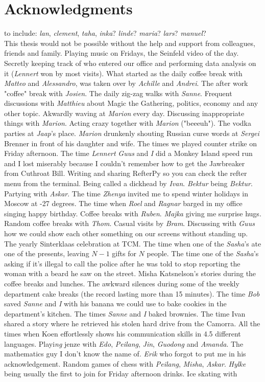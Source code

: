 \chapter*{Acknowledgments}
to include: \emph{lan}, \emph{clement}, \emph{taha}, \emph{inka}? \emph{linde}? \emph{maria}? \emph{lars}? \emph{manuel}?\\
This thesis would not be possible without the help and support from colleagues, friends and family. Playing music on Fridays, the Seinfeld video of the day. Secretly keeping track of who entered our office and performing data analysis on it (\emph{Lennert} won by most visits). What started as the daily coffee break with \emph{Matteo} and \emph{Alessandro}, was taken over by \emph{Achille} and \emph{Andrei}. The after work "coffee" break with \emph{Josien}. The daily zig-zag walks with \emph{Sanne}. Frequent discussions with \emph{Matthieu} about Magic the Gathering, politics, economy and any other topic. Akwardly waving at \emph{Marion} every day. Discussing inappropriate things with \emph{Marion}. Acting crazy together with \emph{Marion} ("beeeuh"). The vodka parties at \emph{Jaap}'s place. \emph{Marion} drunkenly shouting Russian curse words at \emph{Sergei} Brenner in front of his daughter and wife. The times we played counter strike on Friday afternoon. The time \emph{Lennert} \emph{Guus} and \emph{I} did a Monkey Island speed run and I lost miserably because I couldn't remember how to get the Jawbreaker from Cuthroat Bill. Writing and sharing RefterPy so you can check the refter menu from the terminal. Being called a dickhead by \emph{Ivan}. \emph{Bektur} being \emph{Bektur}. Partying with \emph{Askar}. The time \emph{Zhenya} invited me to spend winter holidays in Moscow at -27 degrees. The time when \emph{Roel} and \emph{Ragnar} barged in my office singing happy birthday. Coffee breaks with \emph{Ruben}. \emph{Majka} giving me surprise hugs. Random coffee breaks with \emph{Thom}. Casual visits by \emph{Bram}. Discussing with \emph{Guus} how we could show each other something on our screens without standing up. The yearly Sinterklaas celebration at TCM. The time when one of the \emph{Sasha}'s ate one of the presents, leaving $N-1$ gifts for $N$ people. The time one of the \emph{Sasha}'s asking if it's illegal to call the police after he was told to stop reporting the woman with a beard he saw on the street. Misha Katsnelson's stories during the coffee breaks and lunches. The awkward silences during some of the weekly department cake breaks (the record lasting more than 15 minutes). The time \emph{Bob} saved \emph{Sanne} and \emph{I} with his banana we could use to bake cookies in the department's kitchen. The times \emph{Sanne} and \emph{I} baked brownies. The time Ivan shared a story where he retrieved his stolen hard drive from the Camorra. All the times when Koen effortlessly shows his communication skills in 4.5 different languages. Playi\emph{ng} jenze with \emph{Edo}, \emph{Peilang}, \emph{Jin}, \emph{Guodong} and \emph{Amanda}. The mathematics guy I don't know the name of. \emph{Erik} who forgot to put me in his acknowledgement. Random games of chess with \emph{Peilang}, \emph{Misha}, \emph{Askar}. \emph{Hylke} being usually the first to join for Friday afternoon drinks. Ice skating with 